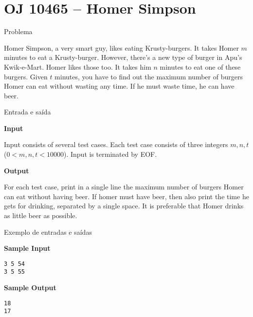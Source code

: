 \section{OJ 10465 -- Homer Simpson}

\begin{frame}[fragile]{Problema}

Homer Simpson, a very smart guy, likes eating Krusty-burgers. It takes Homer $m$ minutes to eat a
Krusty-burger. However, there’s a new type of burger in Apu’s Kwik-e-Mart. Homer likes those too.
It takes him $n$ minutes to eat one of these burgers. Given $t$ minutes, you have to find out the
maximum number of burgers Homer can eat without wasting any time. If he must waste time, he can
have beer.

\end{frame}

\begin{frame}[fragile]{Entrada e saída}

\textbf{Input}

Input consists of several test cases. Each test case consists of three integers $m, n, t$ ($0 < m,
n, t < 10000$). Input is terminated by EOF.

\vspace{0.2in}

\textbf{Output}

For each test case, print in a single line the maximum number of burgers Homer can eat without
having beer. If homer must have beer, then also print the time he gets for drinking, separated by
a single space. It is preferable that Homer drinks as little beer as possible.

\end{frame}

\begin{frame}[fragile]{Exemplo de entradas e saídas}

\begin{minipage}[t]{0.45\textwidth}
\textbf{Sample Input}
\begin{verbatim}
3 5 54
3 5 55
\end{verbatim}
\end{minipage}
\begin{minipage}[t]{0.5\textwidth}
\textbf{Sample Output}
\begin{verbatim}
18
17
\end{verbatim}
\end{minipage}
\end{frame}

